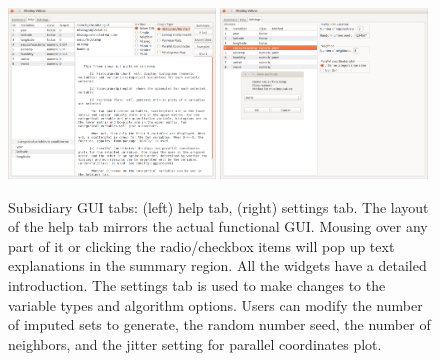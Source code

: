 \documentclass[article]{jss}
\begin{document}
\begin{figure}[!h]
\begin{centering}
\includegraphics[width=0.49\textwidth]{graph/fig1-GUI-tab2} 
\includegraphics[width=0.49\textwidth]{graph/fig1-GUI-tab3}
\par\end{centering}
\caption{Subsidiary GUI tabs: (left) help tab, (right) settings tab. The layout of the help tab mirrors the actual functional GUI. Mousing over any part of it or clicking the radio/checkbox items will pop up text explanations in the summary region. All the widgets have a detailed introduction. The settings tab is used to make changes to the variable types and algorithm options. Users can modify the number of imputed sets to generate, the random number seed, the number of neighbors, and the jitter setting for parallel coordinates plot.}
\label{fig: missingGUI-tabs}
\end{figure}
\end{document}
